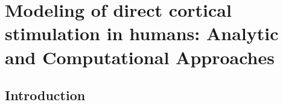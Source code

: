 
 
 
\chapter {Modeling of direct cortical stimulation in humans: Analytic and Computational Approaches}

\section{Introduction}